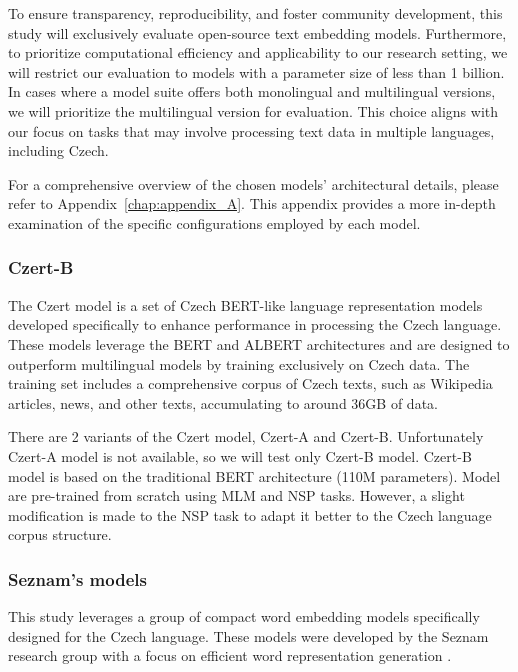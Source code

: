 To ensure transparency, reproducibility, and foster community development, this study will exclusively evaluate open-source text embedding models.  Furthermore, to prioritize computational efficiency and applicability to our research setting, we will restrict our evaluation to models with a parameter size of less than 1 billion.
In cases where a model suite offers both monolingual and multilingual versions, we will prioritize the multilingual version for evaluation. This choice aligns with our focus on tasks that may involve processing text data in multiple languages, including Czech.

For a comprehensive overview of the chosen models' architectural details, please refer to Appendix~\ref{chap:appendix_A}.
This appendix provides a more in-depth examination of the specific configurations employed by each model.

\subsubsection{Czert-B} \label{modelczert-b}

The Czert model \cite{czert} is a set of Czech \ac{BERT}-like language representation models developed specifically to enhance performance in processing the Czech language.
These models leverage the \ac{BERT} and \ac{ALBERT} \cite{ALBERT} architectures and are designed to outperform multilingual models by training exclusively on Czech data.
The training set includes a comprehensive corpus of Czech texts, such as Wikipedia articles, news, and other texts, accumulating to around 36GB of data.

There are 2 variants of the Czert model, Czert-A and Czert-B. Unfortunately Czert-A model is not available, so we will test only Czert-B model.
Czert-B model is based on the traditional \ac{BERT} architecture (110M parameters).
Model are pre-trained from scratch using \ac{MLM} and \ac{NSP} tasks. However, a slight modification is made to the \ac{NSP} task to adapt it better to the Czech language corpus structure.

\subsubsection{Seznam's models} \label{model:seznam}
This study leverages a group of compact word embedding models specifically designed for the Czech language.
These models were developed by the Seznam research group with a focus on efficient word representation generation \cite{seznam-models}.

